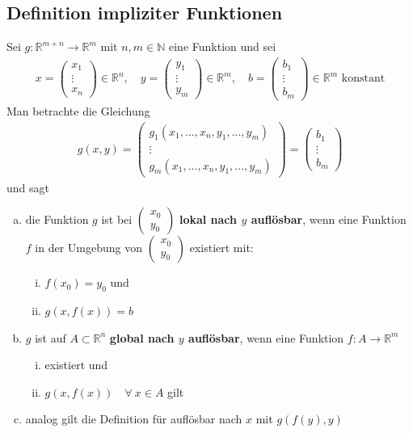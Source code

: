 \documentclass[11pt,a4paper]{book}
\newcommand {\Rn}	{\mathbb{R}^n}
\newcommand {\Rm}	{\mathbb{R}^m}
\newcommand {\Rmn}	{\mathbb{R}^{m+n}}
\newcommand {\N}	{\mathbb{N}}
\newcommand{\1}    	{\mathbbm{1}}
\begin{document}
\subsection{Definition impliziter Funktionen}
Sei \(g: \Rmn \rightarrow \Rm\) mit \(n,m \in \N\) eine Funktion und sei
\begin{align*}
	x = \left( \begin{array}{c}
		x_1 \\ \vdots \\ x_n
	\end{array} \right) \in \Rn, \quad
	y = \left( \begin{array}{c}
		y_1 \\ \vdots \\ y_m
	\end{array} \right) \in \Rm, \quad
	b = \left( \begin{array}{c}
		b_1 \\ \vdots \\ b_m
	\end{array} \right) \in \Rm \textrm{ konstant}
\end{align*}
Man betrachte die Gleichung
\begin{align*}
	g(x,y) = \left( \begin{array}{c}
		g_1(x_1, ..., x_n, y_1, ..., y_m) \\
		\vdots \\
		g_m(x_1, ..., x_n, y_1, ..., y_m)
	\end{array} \right) = \left( \begin{array}{c}
		b_1 \\ \vdots \\ b_m
	\end{array} \right)
\end{align*}
und sagt
\begin{enumerate}[a.~]
	\item die Funktion \(g\) ist bei \(\left(\begin{array}{c} x_0 \\ y_0 \end{array} \right) \) \textbf{lokal nach \(y\) auflösbar}, wenn eine Funktion \(f\) in der Umgebung von \(\left(\begin{array}{c} x_0 \\ y_0 \end{array} \right) \) existiert mit:
	\begin{enumerate}[(i)]
		\item \(f(x_0) = y_0\) und
		\item \(g(x, f(x)) = b\)
	\end{enumerate}
	\item \(g\) ist auf \(A \subset \Rn\) \textbf{global nach \(y\) auflösbar}, wenn eine Funktion \(f : A \rightarrow \Rm\)
	\begin{enumerate}[(i)]
		\item existiert und
		\item \(g(x,f(x)) \quad \forall~ x \in A\) gilt
	\end{enumerate}
	\item analog gilt die Definition für auflösbar nach \(x\) mit \(g(f(y),y)\)
\end{enumerate}
\end{document}
